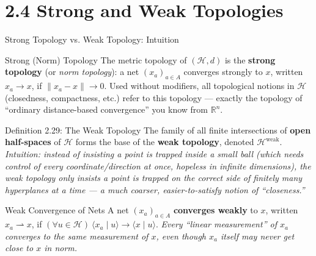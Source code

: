 \documentclass[aspectratio=169,10pt]{beamer}
\newcommand{\R}{\mathbb{R}}
\newcommand{\Hil}{\mathcal{H}}
\newcommand{\wto}{\rightharpoonup}
\newcommand{\ip}[2]{\langle #1 \mid #2 \rangle}
\begin{document}
\section{2.4 Strong and Weak Topologies}

\begin{frame}{Strong Topology vs. Weak Topology: Intuition}
  \begin{block}{Strong (Norm) Topology}
    The metric topology of $(\Hil,d)$ is the \textbf{strong topology} (or
    \emph{norm topology}): a net $(x_a)_{a\in A}$ converges strongly to $x$,
    written $x_a\to x$, if $\|x_a-x\|\to 0$. Used without modifiers, all
    topological notions in $\Hil$ (closedness, compactness, etc.) refer to
    this topology --- exactly the topology of ``ordinary distance-based
    convergence'' you know from $\R^n$.
  \end{block}

  \begin{block}{Definition 2.29: The Weak Topology}
    The family of all finite intersections of \textbf{open half-spaces} of
    $\Hil$ forms the base of the \textbf{weak topology}, denoted
    $\Hil^{\mathrm{weak}}$. \textit{Intuition: instead of insisting a point
    is trapped inside a small \emph{ball} (which needs control of every
    coordinate/direction at once, hopeless in infinite dimensions), the
    weak topology only insists a point is trapped on the correct side of
    finitely many hyperplanes at a time --- a much coarser, easier-to-satisfy
    notion of ``closeness.''}
  \end{block}

  \begin{block}{Weak Convergence of Nets}
    A net $(x_a)_{a\in A}$ \textbf{converges weakly} to $x$, written
    $x_a\wto x$, if $(\forall u\in\Hil)\ \ip{x_a}{u}\to\ip{x}{u}$.
    \textit{Every ``linear measurement'' of $x_a$ converges to the same
    measurement of $x$, even though $x_a$ itself may never get close to $x$
    in norm.}
  \end{block}
\end{frame}
\end{document}
